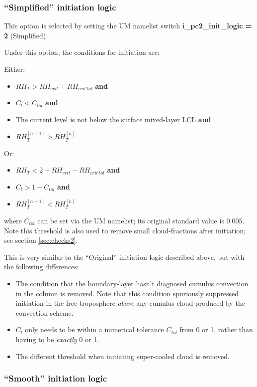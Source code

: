 \documentclass{UMDP_article}
\begin{document}
\subsubsection{``Simplified'' initiation logic}

This option is selected by setting the UM namelist switch
{\bf i\_pc2\_init\_logic = 2} (Simplified)

Under this option, the conditions for initiation are:

Either:
\begin{itemize}
\item $RH_T > RH_{crit} + RH_{crit \, tol}$ \textbf{and}
\item $C_l < C_{tol}$ \textbf{and}
\item The current level is not below the surface mixed-layer LCL \textbf{and}
\item $RH_T^{[n+1]} > RH_T^{[n]}$
\end{itemize}
Or:
\begin{itemize}
\item $RH_T < 2 - RH_{crit} - RH_{crit \, tol}$ \textbf{and}
\item $C_l > 1 - C_{tol}$ \textbf{and}
\item $RH_T^{[n+1]} < RH_T^{[n]}$
\end{itemize}

where $C_{tol}$ can be set via the UM namelist; its original standard value
is 0.005.  Note this threshold is also used to remove small cloud-fractions
after initiation; see section \ref{sec:checks2}.

This is very similar to the ``Original'' initiation logic described above,
but with the following differences:
\begin{itemize}
\item The condition that the boundary-layer hasn't diagnosed cumulus
      convection in the column is removed.
      Note that this condition spuriously suppressed initiation in the free
      troposphere {\em above} any cumulus cloud produced by the convection
      scheme.
\item $C_l$ only needs to be within a numerical tolerance $C_{tol}$ from
      0 or 1, rather than having to be {\it exactly} 0 or 1.
\item The different threshold when initiating super-cooled cloud is removed.
\end{itemize}

\subsubsection{``Smooth'' initiation logic}
\label{sec:smooth_initiation}
\end{document}
